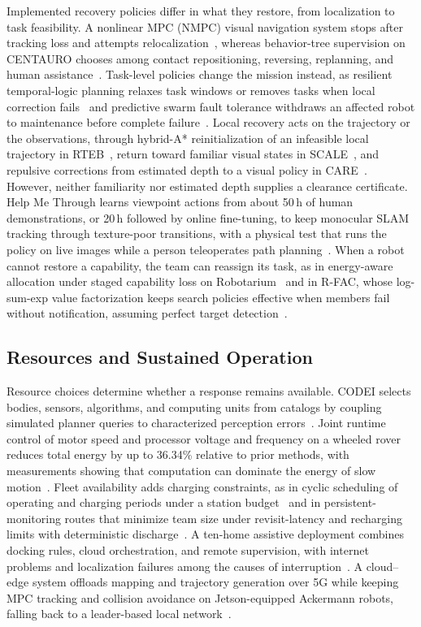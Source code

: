 Implemented recovery policies differ in what they restore, from localization to task feasibility. A nonlinear MPC (NMPC) visual navigation system stops after tracking loss and attempts relocalization~\cite{P_N10}, whereas behavior-tree supervision on CENTAURO chooses among contact repositioning, reversing, replanning, and human assistance~\cite{P_N17}. Task-level policies change the mission instead, as resilient temporal-logic planning relaxes task windows or removes tasks when local correction fails~\cite{P_N15} and predictive swarm fault tolerance withdraws an affected robot to maintenance before complete failure~\cite{P_N13}. Local recovery acts on the trajectory or the observations, through hybrid-A* reinitialization of an infeasible local trajectory in RTEB~\cite{P_S16}, return toward familiar visual states in SCALE~\cite{P_S38}, and repulsive corrections from estimated depth to a visual policy in CARE~\cite{P_S47}. However, neither familiarity nor estimated depth supplies a clearance certificate. Help Me Through learns viewpoint actions from about 50\,h of human demonstrations, or 20\,h followed by online fine-tuning, to keep monocular SLAM tracking through texture-poor transitions, with a physical test that runs the policy on live images while a person teleoperates path planning~\cite{P_R33}. When a robot cannot restore a capability, the team can reassign its task, as in energy-aware allocation under staged capability loss on Robotarium~\cite{P_S17} and in R-FAC, whose log-sum-exp value factorization keeps search policies effective when members fail without notification, assuming perfect target detection~\cite{P_R35}.

\subsection{Resources and Sustained Operation}

Resource choices determine whether a response remains available. CODEI selects bodies, sensors, algorithms, and computing units from catalogs by coupling simulated planner queries to characterized perception errors~\cite{P_M11}. Joint runtime control of motor speed and processor voltage and frequency on a wheeled rover reduces total energy by up to 36.34\% relative to prior methods, with measurements showing that computation can dominate the energy of slow motion~\cite{P_R32}. Fleet availability adds charging constraints, as in cyclic scheduling of operating and charging periods under a station budget~\cite{P_E58} and in persistent-monitoring routes that minimize team size under revisit-latency and recharging limits with deterministic discharge~\cite{P_R34}. A ten-home assistive deployment combines docking rules, cloud orchestration, and remote supervision, with internet problems and localization failures among the causes of interruption~\cite{P_M37}. A cloud--edge system offloads mapping and trajectory generation over 5G while keeping MPC tracking and collision avoidance on Jetson-equipped Ackermann robots, falling back to a leader-based local network~\cite{P_R31}.


